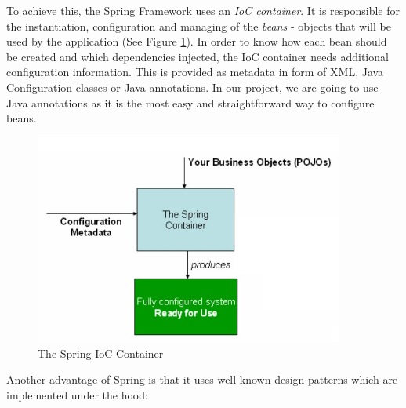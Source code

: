 To achieve this, the Spring Framework uses an \textit{IoC container}. It is responsible for the instantiation, configuration and managing of the \textit{beans} - objects that will be used by the application (See Figure \ref{springIocContainer}). In order to know how each bean should be created and which dependencies injected, the IoC container needs additional configuration information. This is provided as metadata in form of XML, Java Configuration classes or Java annotations. In our project, we are going to use Java annotations as it is the most easy and straightforward way to configure beans.

\begin{figure}[H]
    \centering
    \includegraphics[width=4in]{images/springIocContainer}
    \caption{The Spring IoC Container \cite{springDocs}}
    \label{springIocContainer}
\end{figure}

Another advantage of Spring is that it uses well-known design patterns which are implemented under the hood:

